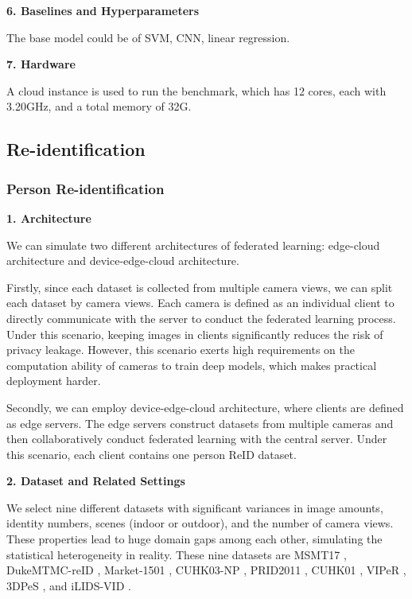\noindent
\textbf{6. Baselines and Hyperparameters}

The base model could be of SVM, CNN, linear regression. 

\noindent
\textbf{7. Hardware}

A cloud instance is used to run the benchmark, which has 12 cores, each with 3.20GHz, and a total memory of 32G.



\subsection{Re-identification}

\subsubsection{Person Re-identification}

\noindent
\textbf{1. Architecture}

We can simulate two different architectures of federated learning: edge-cloud architecture and device-edge-cloud architecture. 

Firstly, since each dataset is collected from multiple camera views, we can split each dataset by camera views. Each camera is defined as an individual client to directly communicate with the server to conduct the federated learning process. Under this scenario, keeping images in clients significantly reduces the risk of privacy leakage. However, this scenario exerts high requirements on the computation ability of cameras to train deep models, which makes practical deployment harder. 

Secondly, we can employ device-edge-cloud architecture, where clients are defined as edge servers. The edge servers construct datasets from multiple cameras and then collaboratively conduct federated learning with the central server. Under this scenario, each client contains one person ReID dataset.

\noindent
\textbf{2. Dataset and Related Settings} 

We select nine different datasets with significant variances in image amounts, identity numbers, scenes (indoor or outdoor), and the number of camera views. These properties lead to huge domain gaps among each other, simulating the statistical heterogeneity in reality. These nine datasets are MSMT17 \cite{Wei2017Msmt}, DukeMTMC-reID \cite{zheng2017dukemtmc-reid}, 
Market-1501 \cite{Zheng2015Market1501}, CUHK03-NP \cite{Li2014CUHK03}, PRID2011 \cite{prid2011}, CUHK01 \cite{li2012cuhk01}, VIPeR \cite{Gray2008ViewpointIP}, 3DPeS \cite{3dpes}, and iLIDS-VID \cite{iLIDS-VID}. 

